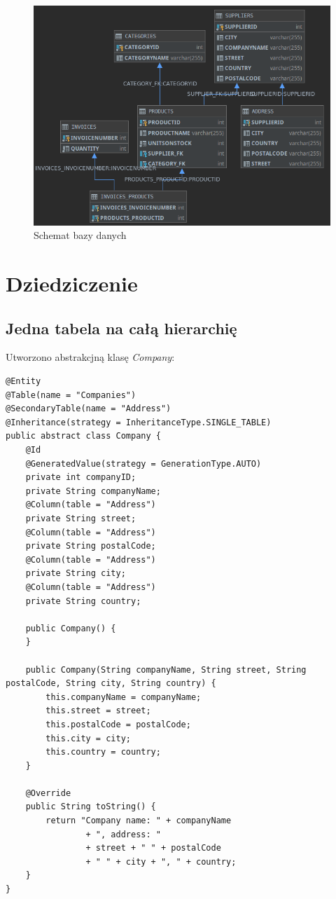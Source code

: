 \documentclass[12pt, a4paper]{mwart}
\begin{document}
\begin{figure}[ht]
  \centering
  \includegraphics[scale=0.5]{X/10-4.png}
  \caption{Schemat bazy danych}
  \label{rys:10.4}
\end{figure}

\clearpage
\section{Dziedziczenie}

\subsection{Jedna tabela na całą hierarchię}

Utworzono abstrakcjną klasę \textit{Company}:
\begin{lstlisting}
@Entity
@Table(name = "Companies")
@SecondaryTable(name = "Address")
@Inheritance(strategy = InheritanceType.SINGLE_TABLE)
public abstract class Company {
    @Id
    @GeneratedValue(strategy = GenerationType.AUTO)
    private int companyID;
    private String companyName;
    @Column(table = "Address")
    private String street;
    @Column(table = "Address")
    private String postalCode;
    @Column(table = "Address")
    private String city;
    @Column(table = "Address")
    private String country;

    public Company() {
    }

    public Company(String companyName, String street, String postalCode, String city, String country) {
        this.companyName = companyName;
        this.street = street;
        this.postalCode = postalCode;
        this.city = city;
        this.country = country;
    }
    
    @Override
    public String toString() {
        return "Company name: " + companyName
                + ", address: "
                + street + " " + postalCode
                + " " + city + ", " + country;
    }
}
\end{lstlisting}
\end{document}
